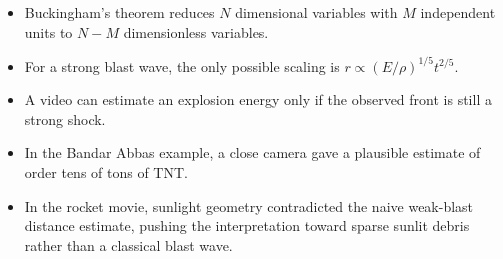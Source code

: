 \begin{itemize}
    \item Buckingham's theorem reduces $N$ dimensional variables with $M$
    independent units to $N-M$ dimensionless variables.
    \item For a strong blast wave, the only possible scaling is
    $r\propto(E/\rho)^{1/5}t^{2/5}$.
    \item A video can estimate an explosion energy only if the observed front
    is still a strong shock.
    \item In the Bandar Abbas example, a close camera gave a plausible estimate
    of order tens of tons of TNT.
    \item In the rocket movie, sunlight geometry contradicted the naive
    weak-blast distance estimate, pushing the interpretation toward sparse
    sunlit debris rather than a classical blast wave.
\end{itemize}

